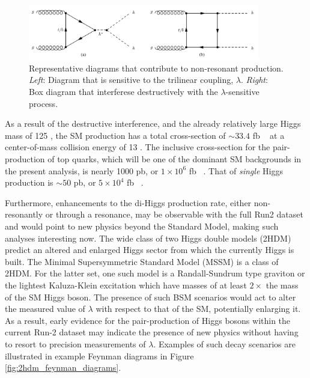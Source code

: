 \begin{figure}[!htb]
    \centering
    \includegraphics[width=0.9\textwidth]{figures/sm_nonres_hh_production}
    \caption{Representative diagrams that contribute to non-resonant \hh production.
    \textit{Left}: Diagram that is sensitive to the trilinear coupling, $\lambda$.
    \textit{Right}: Box diagram that interferese destructively with the $\lambda$-sensitive
    process.} 
    \label{fig:sm_nonres_hh}
\end{figure}


As a result of the destructive interference, and the already relatively large Higgs mass of
125 \GeV, the SM \dihiggs production has a total cross-section of $\sim 33.4$ fb ~\cite{CERN-YR-4}
at a \pp center-of-mass collision energy of 13 \TeV. The inclusive cross-section for the pair-production
of top quarks, which will be one of the dominant SM backgrounds in the present
analysis, is nearly 1000 pb, or $1\times10^6$ fb ~\cite{TOPQ-2015-09, ATLAS-CONF-2015-049}. That
of \textit{single} Higgs production is $\sim 50$ pb, or $5 \times 10^4$ fb ~\cite{ATLAS-CONF-2015-060}.

Furthermore, enhancements to the di-Higgs production rate, either non-resonantly or through a resonance, may be observable with the full Run2 dataset and would point to new physics beyond the Standard Model, making such analyses interesting now. The wide class of two Higgs double models (2HDM) predict an altered and enlarged
Higgs sector from which the currently Higgs is built.
The Minimal Supersymmetric Standard Model
(MSSM) is a  class of 2HDM. For the latter set, one such model is a Randall-Sundrum
type graviton or the lightest Kaluza-Klein excitation which have masses of at least
$2\times$ the mass of the SM Higgs boson. The presence of such BSM scenarios would act to alter
the measured value of $\lambda$ with respect to that of the SM, potentially enlarging it.
As a result, early evidence for the pair-production of Higgs bosons within the current
Run-2 dataset may indicate the presence of new physics without having to resort to
precision measurements of $\lambda$. Examples of such decay
scenarios are illustrated in example Feynman diagrams in Figure \ref{fig:2hdm_feynman_diagrams}.


